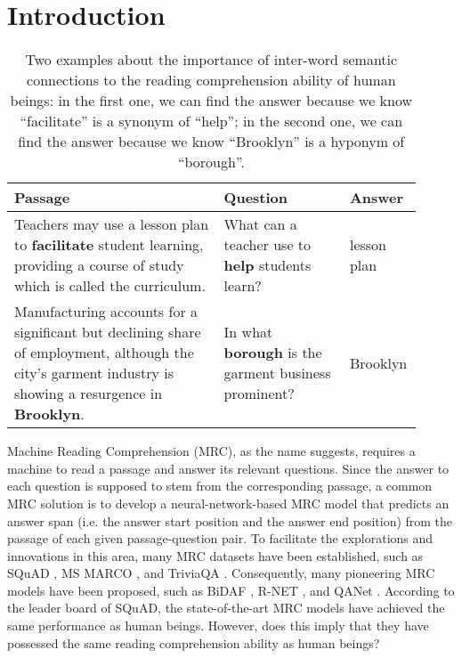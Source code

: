 \documentclass[11pt,a4paper]{article}
\begin{document}
\section{Introduction}
\begin{table*}
\centering
\begin{tabular}
{|m{0.5\linewidth}|m{0.3\linewidth}|m{0.11\linewidth}|}
\hline
\textbf{Passage} &
\textbf{Question} &
\textbf{Answer} \\
\hline
Teachers may use a lesson plan to \textbf{facilitate} student learning, providing a course of study which is called the curriculum. &
What can a teacher use to \textbf{help} students learn? &
lesson plan \\
\hline
Manufacturing accounts for a significant but declining share of employment, although the city's garment industry is showing a resurgence in \textbf{Brooklyn}. &
In what \textbf{borough} is the garment business prominent? &
Brooklyn \\
\hline
\end{tabular}
\caption{\label{t1} Two examples about the importance of inter-word semantic connections to the reading comprehension ability of human beings: in the first one, we can find the answer because we know ``facilitate'' is a synonym of ``help''; in the second one, we can find the answer because we know ``Brooklyn'' is a hyponym of ``borough''.}
\end{table*}
Machine Reading Comprehension (MRC), as the name suggests, requires a machine to read a passage and answer its relevant questions. Since the answer to each question is supposed to stem from the corresponding passage, a common MRC solution is to develop a neural-network-based MRC model that predicts an answer span (i.e. the answer start position and the answer end position) from the passage of each given passage-question pair. To facilitate the explorations and innovations in this area, many MRC datasets have been established, such as SQuAD \cite{rajpurkarpranav:2016}, MS MARCO \cite{nguyentri:2016}, and TriviaQA \cite{joshimandar:2017}. Consequently, many pioneering MRC models have been proposed, such as BiDAF \cite{seominjoon:2016}, R-NET \cite{wangwenhui:2017}, and QANet \cite{yuadamswei:2018}. According to the leader board of SQuAD, the state-of-the-art MRC models have achieved the same performance as human beings. However, does this imply that they have possessed the same reading comprehension ability as human beings? \\
\end{document}
